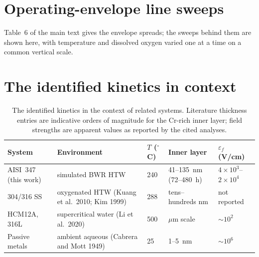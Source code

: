 \section{Operating-envelope line sweeps}
\label{sec:sweeps}

Table~6 of the main text gives the envelope spreads; the sweeps behind them are
shown here, with temperature and dissolved oxygen varied one at a time on a
common vertical scale.

\section{The identified kinetics in context}
\label{sec:context}

\begin{table}[htbp]
\centering
\caption{The identified kinetics in the context of related systems.
Literature thickness entries are indicative orders of magnitude for the
Cr-rich inner layer; field strengths are apparent values as reported by
the cited analyses.}
\label{tab:context}
\scriptsize
\setlength{\tabcolsep}{4pt}
\begin{tabular}{lllll}
\toprule
System & Environment & $T$ ($^\circ$C) & Inner layer & $\varepsilon_f$ (V/cm) \\
\midrule
AISI~347 (this work) & simulated BWR HTW & 240 & 41--135~nm (72--480~h) & $4\times10^3$--$2\times10^4$ \\
304/316 SS & oxygenated HTW (Kuang et al.\ 2010; Kim 1999) & 288 & tens--hundreds nm & not reported \\
HCM12A, 316L & supercritical water (Li et al.\ 2020) & 500 & $\mu$m scale & $\sim10^2$ \\
Passive metals & ambient aqueous (Cabrera and Mott 1949) & 25 & 1--5~nm & $\sim10^6$ \\
\bottomrule
\end{tabular}
\end{table}
